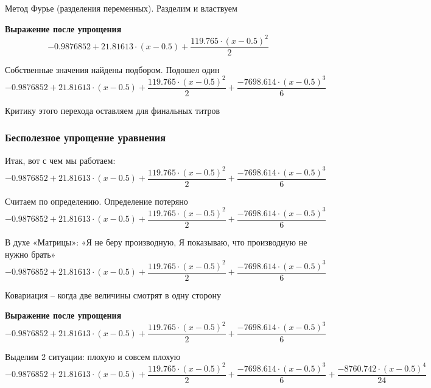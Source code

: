 \documentclass{article}
\begin{document}
Метод Фурье (разделения переменных). Разделим и властвуем 

\noindent\textbf{Выражение после упрощения}\\[4pt]
\begin{dmath*}
-0.9876852 + 21.81613 \cdot (x - 0.5) + \frac{119.765 \cdot (x - 0.5)^{2}}{2}
\end{dmath*}


Собственные значения найдены подбором. Подошел один 
\begin{dmath*}
-0.9876852 + 21.81613 \cdot (x - 0.5) + \frac{119.765 \cdot (x - 0.5)^{2}}{2} + \frac{-7698.614 \cdot (x - 0.5)^{3}}{6}
\end{dmath*}


Критику этого перехода оставляем для финальных титров 
\subsubsection*{Бесполезное упрощение уравнения}

Итак, вот с чем мы работаем:\\
\begin{dmath*}
-0.9876852 + 21.81613 \cdot (x - 0.5) + \frac{119.765 \cdot (x - 0.5)^{2}}{2} + \frac{-7698.614 \cdot (x - 0.5)^{3}}{6}
\end{dmath*}


Считаем по определению. Определение потеряно 
\begin{dmath*}
-0.9876852 + 21.81613 \cdot (x - 0.5) + \frac{119.765 \cdot (x - 0.5)^{2}}{2} + \frac{-7698.614 \cdot (x - 0.5)^{3}}{6}
\end{dmath*}


В духе «Матрицы»: «Я не беру производную, Я показываю, что производную не нужно брать» 
\begin{dmath*}
-0.9876852 + 21.81613 \cdot (x - 0.5) + \frac{119.765 \cdot (x - 0.5)^{2}}{2} + \frac{-7698.614 \cdot (x - 0.5)^{3}}{6}
\end{dmath*}


Ковариация – когда две величины смотрят в одну сторону 

\noindent\textbf{Выражение после упрощения}\\[4pt]
\begin{dmath*}
-0.9876852 + 21.81613 \cdot (x - 0.5) + \frac{119.765 \cdot (x - 0.5)^{2}}{2} + \frac{-7698.614 \cdot (x - 0.5)^{3}}{6}
\end{dmath*}


Выделим 2 ситуации: плохую и совсем плохую 
\begin{dmath*}
-0.9876852 + 21.81613 \cdot (x - 0.5) + \frac{119.765 \cdot (x - 0.5)^{2}}{2} + \frac{-7698.614 \cdot (x - 0.5)^{3}}{6} + \frac{-8760.742 \cdot (x - 0.5)^{4}}{24}
\end{dmath*}
\end{document}
